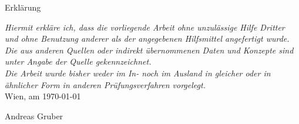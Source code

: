 

\pagestyle{empty}
\newpage
\vspace*{5 cm}
\begin{center}
Erklärung
\end{center}
\vfill
\emph{Hiermit erkläre ich, dass die vorliegende Arbeit ohne unzulässige Hilfe
Dritter und ohne Benutzung anderer als der angegebenen Hilfsmittel angefertigt
wurde. Die aus anderen Quellen oder indirekt übernommenen Daten und Konzepte
sind unter Angabe der Quelle gekennzeichnet.\\\vfill Die Arbeit wurde bisher
weder im In- noch im Ausland in gleicher oder in ähnlicher Form in anderen
Prüfungsverfahren vorgelegt.}
\\\vfill
Wien, am \today\hfill\hrulefill
\vfill
\begin{flushright}
Andreas Gruber\\
\vspace*{5 cm}
\vfill
\end{flushright}
\newpage




